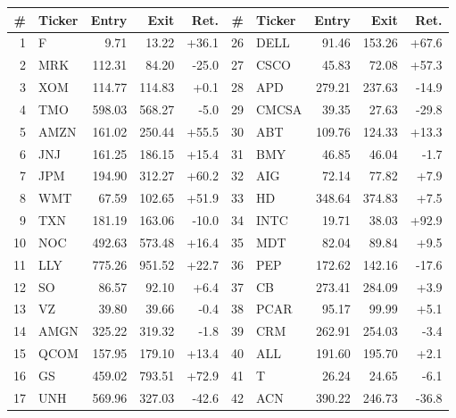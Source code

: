 \begin{tabular}{rlrrr@{\hspace{2em}}rlrrr}
\toprule
\# & Ticker & Entry & Exit & Ret. & \# & Ticker & Entry & Exit & Ret. \\
\midrule
1 & F & 9.71 & 13.22 & \textcolor{pos}{+36.1} & 26 & DELL & 91.46 & 153.26 & \textcolor{pos}{+67.6} \\
2 & MRK & 112.31 & 84.20 & \textcolor{neg}{-25.0} & 27 & CSCO & 45.83 & 72.08 & \textcolor{pos}{+57.3} \\
3 & XOM & 114.77 & 114.83 & \textcolor{pos}{+0.1} & 28 & APD & 279.21 & 237.63 & \textcolor{neg}{-14.9} \\
4 & TMO & 598.03 & 568.27 & \textcolor{neg}{-5.0} & 29 & CMCSA & 39.35 & 27.63 & \textcolor{neg}{-29.8} \\
5 & AMZN & 161.02 & 250.44 & \textcolor{pos}{+55.5} & 30 & ABT & 109.76 & 124.33 & \textcolor{pos}{+13.3} \\
6 & JNJ & 161.25 & 186.15 & \textcolor{pos}{+15.4} & 31 & BMY & 46.85 & 46.04 & \textcolor{neg}{-1.7} \\
7 & JPM & 194.90 & 312.27 & \textcolor{pos}{+60.2} & 32 & AIG & 72.14 & 77.82 & \textcolor{pos}{+7.9} \\
8 & WMT & 67.59 & 102.65 & \textcolor{pos}{+51.9} & 33 & HD & 348.64 & 374.83 & \textcolor{pos}{+7.5} \\
9 & TXN & 181.19 & 163.06 & \textcolor{neg}{-10.0} & 34 & INTC & 19.71 & 38.03 & \textcolor{pos}{+92.9} \\
10 & NOC & 492.63 & 573.48 & \textcolor{pos}{+16.4} & 35 & MDT & 82.04 & 89.84 & \textcolor{pos}{+9.5} \\
11 & LLY & 775.26 & 951.52 & \textcolor{pos}{+22.7} & 36 & PEP & 172.62 & 142.16 & \textcolor{neg}{-17.6} \\
12 & SO & 86.57 & 92.10 & \textcolor{pos}{+6.4} & 37 & CB & 273.41 & 284.09 & \textcolor{pos}{+3.9} \\
13 & VZ & 39.80 & 39.66 & \textcolor{neg}{-0.4} & 38 & PCAR & 95.17 & 99.99 & \textcolor{pos}{+5.1} \\
14 & AMGN & 325.22 & 319.32 & \textcolor{neg}{-1.8} & 39 & CRM & 262.91 & 254.03 & \textcolor{neg}{-3.4} \\
15 & QCOM & 157.95 & 179.10 & \textcolor{pos}{+13.4} & 40 & ALL & 191.60 & 195.70 & \textcolor{pos}{+2.1} \\
16 & GS & 459.02 & 793.51 & \textcolor{pos}{+72.9} & 41 & T & 26.24 & 24.65 & \textcolor{neg}{-6.1} \\
17 & UNH & 569.96 & 327.03 & \textcolor{neg}{-42.6} & 42 & ACN & 390.22 & 246.73 & \textcolor{neg}{-36.8} \\

\end{tabular}
